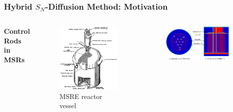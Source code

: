 \begin{frame}
  \frametitle{Hybrid $S_N$-Diffusion Method: Motivation}
  \begin{columns}
    \hfill
    \column[t]{5cm}
    \textbf{Control Rods in MSRs}
    \vspace{.2cm}
    \begin{figure}
      \centering
      \includegraphics[width=\columnwidth]{images/msre-cutout}
      \caption{\footnotesize MSRE reactor vessel \cite{robertson_msre_1965}}
    \end{figure}
    \hfill
    \column[t]{6cm}
    \begin{figure}
      \centering
      \includegraphics[width=.8\columnwidth]{images/tmsr}

\end{figure}
\end{columns}
\end{frame}
